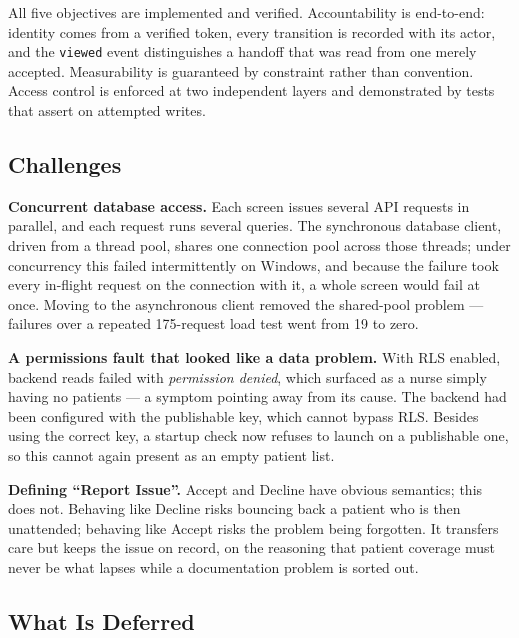 \documentclass{tietreport}
\begin{document}
All five objectives are implemented and verified.
Accountability is end-to-end: identity comes from a verified
token, every transition is recorded with its actor, and the
\texttt{viewed} event distinguishes a handoff that was read
from one merely accepted. Measurability is guaranteed by
constraint rather than convention. Access control is
enforced at two independent layers and demonstrated by tests
that assert on attempted writes.

\subsection{Challenges}
\label{sec:challenges}

\textbf{Concurrent database access.} Each screen issues
several API requests in parallel, and each request runs
several queries. The synchronous database client, driven
from a thread pool, shares one connection pool across those
threads; under concurrency this failed intermittently on
Windows, and because the failure took every in-flight
request on the connection with it, a whole screen would fail
at once. Moving to the asynchronous client removed the
shared-pool problem --- failures over a repeated
175-request load test went from 19 to zero.

\textbf{A permissions fault that looked like a data
problem.} With RLS enabled, backend reads failed with
\emph{permission denied}, which surfaced as a nurse simply
having no patients --- a symptom pointing away from its
cause. The backend had been configured with the publishable
key, which cannot bypass RLS. Besides using the correct key,
a startup check now refuses to launch on a publishable one,
so this cannot again present as an empty patient list.

\textbf{Defining ``Report Issue''.} Accept and Decline have
obvious semantics; this does not. Behaving like Decline
risks bouncing back a patient who is then unattended;
behaving like Accept risks the problem being forgotten. It
transfers care but keeps the issue on record, on the
reasoning that patient coverage must never be what lapses
while a documentation problem is sorted out.

\subsection{What Is Deferred}
\label{sec:deferred}
\end{document}
